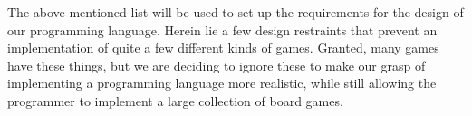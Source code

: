The above-mentioned list will be used to set up the requirements for the design of our programming language. 
Herein lie a few design restraints that prevent an implementation of quite a few different kinds of games. 
Granted, many games have these things, but we are deciding to ignore these to make our grasp of implementing a programming language more realistic, while still allowing the programmer to implement a large collection of board games.



